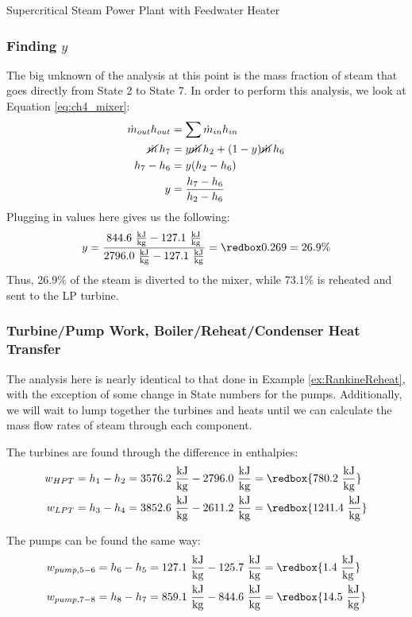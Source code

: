 \begin{example}[label=ex:ch4FeedwaterHeater]{Supercritical Steam Power Plant with Feedwater Heater}
  \subsubsection*{Finding $y$}
  The big unknown of the analysis at this point is the mass fraction of steam that goes directly from State 2 to State 7.  In order to perform this analysis, we look at Equation \ref{eq:ch4_mixer}:
  \begin{align*}
    \dot{m}_{out} h_{out} &= \sum \dot{m}_{in} h_{in} \\
    \cancel{\dot{m}}\, h_7 &= y \cancel{\dot{m}}\, h_2 + (1-y)\cancel{\dot{m}}\,h_6 \\
    h_7 - h_6 &= y(h_2 - h_6) \\
    y &= \frac{h_7 - h_6}{h_2-h_6}
  \end{align*}
  Plugging in values here gives us the following:
  \begin{equation*}
    y = \frac{844.6\ \frac{\rm kJ}{\rm kg} - 127.1\ \frac{\rm kJ}{\rm kg}}{2796.0\ \frac{\rm kJ}{\rm kg}-127.1\ \frac{\rm kJ}{\rm kg}} = \redbox{0.269 = 26.9\%}
  \end{equation*}
  Thus, 26.9\% of the steam is diverted to the mixer, while 73.1\% is reheated and sent to the LP turbine.

  \subsubsection*{Turbine/Pump Work, Boiler/Reheat/Condenser Heat Transfer}
  The analysis here is nearly identical to that done in Example \ref{ex:RankineReheat}, with the exception of some change in State numbers for the pumps.  Additionally, we will wait to lump together the turbines and heats until we can calculate the mass flow rates of steam through each component.

  The turbines are found through the difference in enthalpies:
  \begin{align*}
    w_{HPT} &= h_1 - h_2 = 3576.2\ \frac{\rm kJ}{\rm kg} - 2796.0\ \frac{\rm kJ}{\rm kg} = \redbox{780.2\ \frac{\rm kJ}{\rm kg}} \\
    w_{LPT} &= h_3 - h_4 = 3852.6\ \frac{\rm kJ}{\rm kg} - 2611.2\ \frac{\rm kJ}{\rm kg} = \redbox{1241.4\ \frac{\rm kJ}{\rm kg}}
  \end{align*}

  The pumps can be found the same way:
  \begin{align*}
    w_{pump, 5-6} &= h_6 - h_5 = 127.1\ \frac{\rm kJ}{\rm kg} - 125.7\ \frac{\rm kJ}{\rm kg} = \redbox{1.4\ \frac{\rm kJ}{\rm kg}} \\
    w_{pump, 7-8} &= h_8 - h_7 = 859.1\ \frac{\rm kJ}{\rm kg} - 844.6\ \frac{\rm kJ}{\rm kg} = \redbox{14.5\ \frac{\rm kJ}{\rm kg}}
  \end{align*}


\end{example}

